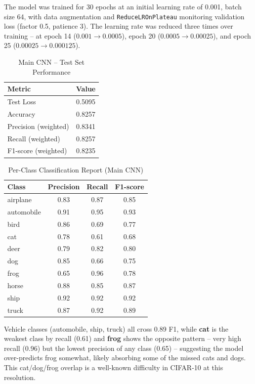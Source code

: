\documentclass[11pt]{article}
\begin{document}
The model was trained for 30 epochs at an initial learning rate of 0.001, batch size 64, with data augmentation and \texttt{ReduceLROnPlateau} monitoring validation loss (factor 0.5, patience 3). The learning rate was reduced three times over training -- at epoch 14 ($0.001\rightarrow0.0005$), epoch 20 ($0.0005\rightarrow0.00025$), and epoch 25 ($0.00025\rightarrow0.000125$).

\begin{table}[H]
\centering
\caption{Main CNN -- Test Set Performance}
\begin{tabular}{lc}
\toprule
Metric & Value \\
\midrule
Test Loss & 0.5095 \\
Accuracy & 0.8257 \\
Precision (weighted) & 0.8341 \\
Recall (weighted) & 0.8257 \\
F1-score (weighted) & 0.8235 \\
\bottomrule
\end{tabular}
\end{table}

\begin{table}[H]
\centering
\caption{Per-Class Classification Report (Main CNN)}
\begin{tabular}{lccc}
\toprule
Class & Precision & Recall & F1-score \\
\midrule
airplane   & 0.83 & 0.87 & 0.85 \\
automobile & 0.91 & 0.95 & 0.93 \\
bird       & 0.86 & 0.69 & 0.77 \\
cat        & 0.78 & 0.61 & 0.68 \\
deer       & 0.79 & 0.82 & 0.80 \\
dog        & 0.85 & 0.66 & 0.75 \\
frog       & 0.65 & 0.96 & 0.78 \\
horse      & 0.88 & 0.85 & 0.87 \\
ship       & 0.92 & 0.92 & 0.92 \\
truck      & 0.87 & 0.92 & 0.89 \\
\bottomrule
\end{tabular}
\end{table}

Vehicle classes (automobile, ship, truck) all cross 0.89 F1, while \textbf{cat} is the weakest class by recall (0.61) and \textbf{frog} shows the opposite pattern -- very high recall (0.96) but the lowest precision of any class (0.65) -- suggesting the model over-predicts frog somewhat, likely absorbing some of the missed cats and dogs. This cat/dog/frog overlap is a well-known difficulty in CIFAR-10 at this resolution.
\end{document}
